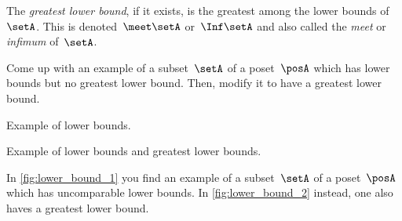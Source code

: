 \begin{ctdefinition}
    The \emph{greatest lower bound}, if it exists, is the greatest among the lower bounds of~$\setA$.
    This is denoted~$\meet \setA$ or~$\Inf \setA$ and also called the \emph{meet} or \emph{infimum} of~$\setA$.
\end{ctdefinition}

\begin{exercise}
    Come up with an example of a subset~$\setA$ of a poset~$\posA$ which has lower bounds but no greatest lower bound.
    Then, modify it to have a greatest lower bound.
\end{exercise}

\begin{solution}
    \begin{marginfigure}
        \centering
        \caption{Example of lower bounds. \label{fig:lower_bound_1}}
    \end{marginfigure}
    \begin{marginfigure}
        \centering
        \caption{Example of lower bounds and greatest lower bounds. \label{fig:lower_bound_2}}
    \end{marginfigure}

    In \cref{fig:lower_bound_1} you find an example of a subset~$\setA$ of a poset~$\posA$ which has uncomparable lower bounds.
    In \cref{fig:lower_bound_2} instead, one also haves a greatest lower bound.

\end{solution}


